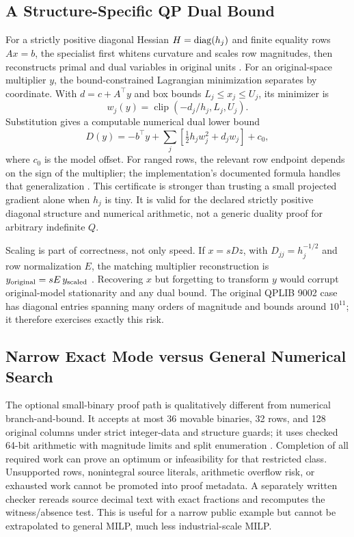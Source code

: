 \documentclass[10pt,a4paper,twocolumn]{article}
\begin{document}
\subsection{A Structure-Specific QP Dual Bound}

For a strictly positive diagonal Hessian $H={\rm diag}(h_j)$ and finite equality rows $Ax=b$, the specialist first whitens curvature and scales row magnitudes, then reconstructs primal and dual variables in original units \cite{diagmethod}. For an original-space multiplier $y$, the bound-constrained Lagrangian minimization separates by coordinate. With $d=c+A^\top y$ and box bounds $L_j\leq x_j\leq U_j$, its minimizer is
\begin{equation}
 w_j(y)=\operatorname{clip}\!\left(-d_j/h_j,L_j,U_j\right).
 \label{eq:clip}
\end{equation}
Substitution gives a computable numerical dual lower bound
\begin{equation}
 D(y)=-b^\top y+\sum_j\left[\tfrac12h_jw_j^2+d_jw_j\right]+c_0,
 \label{eq:qpdual}
\end{equation}
where $c_0$ is the model offset. For ranged rows, the relevant row endpoint depends on the sign of the multiplier; the implementation's documented formula handles that generalization \cite{diagmethod}. This certificate is stronger than trusting a small projected gradient alone when $h_j$ is tiny. It is valid for the declared strictly positive diagonal structure and numerical arithmetic, not a generic duality proof for arbitrary indefinite $Q$.

Scaling is part of correctness, not only speed. If $x=sDz$, with $D_{jj}=h_j^{-1/2}$ and row normalization $E$, the matching multiplier reconstruction is $y_{\rm original}=sE\,y_{\rm scaled}$ \cite{diagmethod}. Recovering $x$ but forgetting to transform $y$ would corrupt original-model stationarity and any dual bound. The original QPLIB 9002 case has diagonal entries spanning many orders of magnitude and bounds around $10^{11}$; it therefore exercises exactly this risk.

\subsection{Narrow Exact Mode versus General Numerical Search}

The optional small-binary proof path is qualitatively different from numerical branch-and-bound. It accepts at most 36 movable binaries, 32 rows, and 128 original columns under strict integer-data and structure guards; it uses checked 64-bit arithmetic with magnitude limits and split enumeration \cite{binaryproof}. Completion of all required work can prove an optimum or infeasibility for that restricted class. Unsupported rows, nonintegral source literals, arithmetic overflow risk, or exhausted work cannot be promoted into proof metadata. A separately written checker rereads source decimal text with exact fractions and recomputes the witness/absence test. This is useful for a narrow public example but cannot be extrapolated to general MILP, much less industrial-scale MILP.
\end{document}
